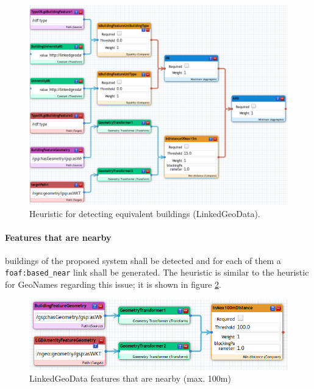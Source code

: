 \documentclass[draft,final]{vutinfth} %
\begin{document}
\begin{figure}[h]
    \centering
    \includegraphics[width=1.0\textwidth]{graphics/linking/linkedgeodataBuildingFeatureSameAs.png}
    \caption{Heuristic for detecting equivalent buildings (LinkedGeoData).}
    \label{fig:solution-architectural-prototype:ld-management:linking:lgdSameAs}
\end{figure}

\paragraph{Features that are nearby} buildings of the proposed system shall be detected and for each of them a \texttt{foaf:based\_near} link shall be generated. The heuristic is similar to the heuristic for GeoNames regarding this issue; it is shown in figure \ref{fig:solution-architectural-prototype:ld-management:linking:lgdNearBy}.

\begin{figure}[h]
    \centering
    \includegraphics[width=1.0\textwidth]{graphics/linking/linkedgeodataAmenityNearBy.png}
    \caption{LinkedGeoData features that are nearby (max. 100m)}
    \label{fig:solution-architectural-prototype:ld-management:linking:lgdNearBy}
\end{figure}
\end{document}
